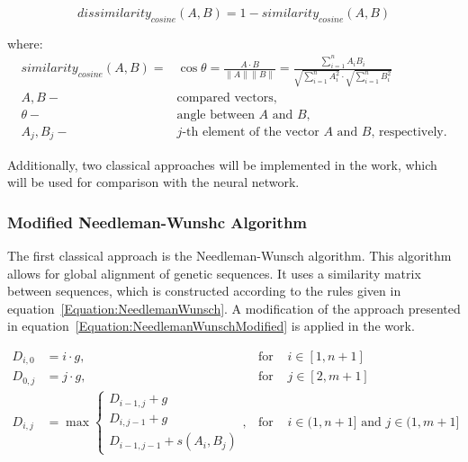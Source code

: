 \documentclass[pdflatex,sn-vancouver-num]{sn-jnl}%
\begin{document}
            \begin{equation}
                dissimilarity_{cosine}(A, B) = 1 - similarity_{cosine}(A, B)
                \label{Equation:CosineDissimilarity}
            \end{equation}

            where:
            \begin{align*}
                similarity_{cosine}(A, B) =& \cos{\theta} = \frac{A \cdot B}{\|A\| \|B\|} = \frac{
                    \sum^{n}_{i = 1}A_i B_i
                }{
                    \sqrt{
                        \sum^{n}_{i = 1}A_i^2
                    }
                    \cdot
                    \sqrt{
                        \sum^{n}_{i = 1}B_i^2
                    }
                } \\
                A, B -& \text{compared vectors,} \\
                \theta -& \text{angle between $A$ and $B$,} \\
                A_j, B_j -& \text{$j$-th element of the vector $A$ and $B$, respectively.}
            \end{align*}

            Additionally, two classical approaches will be implemented in the work, which will be used for comparison with the neural network.

            \subsubsection{Modified Needleman-Wunshc Algorithm}
                The first classical approach is the Needleman-Wunsch algorithm. This algorithm allows for global alignment of genetic sequences. It uses a similarity matrix between sequences, which is constructed according to the rules given in equation~\eqref{Equation:NeedlemanWunsch}. A modification of the approach presented in equation~\eqref{Equation:NeedlemanWunschModified} is applied in the work.

                \begin{equation}
                    \begin{aligned}
                        D_{i,0} &= i \cdot g, & \text{for } & i \in [1, n + 1] \\
                        D_{0,j} &= j \cdot g, & \text{for } & j \in [2, m + 1] \\
                        D_{i,j} &= \max
                        \begin{cases}
                            D_{i - 1, j} + g \\
                            D_{i, j - 1} + g \\
                            D_{i - 1, j - 1} + s(A_i, B_j)
                        \end{cases}, & \text{for } & i \in (1, n + 1] \text{ and } j \in (1, m + 1]
                    \end{aligned}
                    \label{Equation:NeedlemanWunsch}
                \end{equation}
\end{document}
